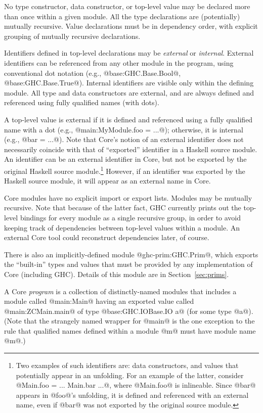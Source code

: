\documentclass[10pt]{article}
\begin{document}
No type constructor, data constructor, or top-level value may be declared more than once within a given module.
All the type declarations are (potentially) mutually recursive. Value declarations must be
in dependency order, with explicit grouping of mutually recursive declarations.


Identifiers defined in top-level declarations may be {\it external} or {\it internal}.
External identifiers can be referenced from any other module in
the program, using conventional dot notation (e.g., @base:GHC.Base.Bool@, @base:GHC.Base.True@).  
Internal identifiers are visible only within the defining module.
All type and data constructors are external, and are always defined and referenced using
fully qualified names (with dots).  

A top-level value is external if it is defined and referenced 
using a fully qualified name with a dot (e.g., @main:MyModule.foo = ...@); otherwise, it is internal
(e.g., @bar = ...@).  
Note that Core's notion of an external identifier does not necessarily coincide with that of ``exported''
identifier in a Haskell source module. An identifier can be an external identifier in Core, but not be exported by the original Haskell source module.\footnote{Two examples of such identifiers are: data constructors, and values that potentially appear in an unfolding. For an example of the latter, consider @Main.foo = ... Main.bar ...@, where @Main.foo@ is inlineable. Since @bar@ appears in @foo@'s unfolding, it is defined and referenced with an external name, even if @bar@ was not exported by the original source module.} However, if an identifier was exported by the Haskell source module, it will appear as an external name in Core.

Core modules have no explicit import or export lists. 
Modules may be mutually recursive. Note that because of the latter fact, GHC currently prints out the top-level bindings for every module as a single recursive group, in order to avoid keeping track of dependencies between top-level values within a module. An external Core tool could reconstruct dependencies later, of course.

There is also an implicitly-defined module @ghc-prim:GHC.Prim@, which exports the ``built-in'' types and values
that must be provided by any implementation of Core (including GHC).   Details of this
module are in Section~\ref{sec:prims}.

A Core {\em program} is a collection of distinctly-named modules that includes a module
called @main:Main@ having an exported value called @main:ZCMain.main@ of type @base:GHC.IOBase.IO a@ (for some type @a@). (Note that the strangely named wrapper for @main@ is the one exception to the rule that qualified names defined within a module @m@ must have module name @m@.)
\end{document}

